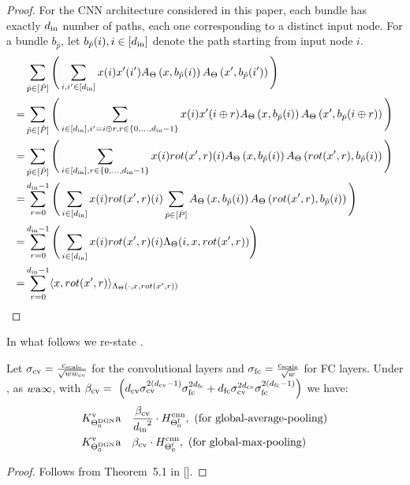 \begin{proof}
For the CNN architecture considered in this paper, each bundle has exactly $d_{\text{in}}$ number of paths, each one corresponding to a distinct input node. For a bundle $b_{\hat{p}}$, let $b_{\hat{p}}(i),i\in[d_{\text{in}}]$ denote the path starting from input node $i$.
\begin{align*}
&\sum_{\hat{p}\in [\hat{P}]} \Bigg(\sum_{i,i'\in[d_{\text{in}}]} x(i) x'(i') A_{\Theta}\left(x,b_{\hat{p}}(i)\right) A_{\Theta}\left(x',b_{\hat{p}}(i')\right) \Bigg)\\
=&\sum_{\hat{p}\in [\hat{P}]}\Bigg(\sum_{i\in[d_{\text{in}}],i'=i\oplus r, r\in\{0,\ldots,d_{\text{in}}-1\}} x(i) x'(i\oplus r) A_{\Theta}\left(x,b_{\hat{p}}(i)\right) A_{\Theta}\left(x',b_{\hat{p}}(i\oplus r)\right)\Bigg)\\
=&\sum_{\hat{p}\in [\hat{P}]}\Bigg(\sum_{i\in[d_{\text{in}}], r\in\{0,\ldots,d_{\text{in}}-1\}} x(i) rot(x',r)(i) A_{\Theta}\left(x,b_{\hat{p}}(i)\right) A_{\Theta}\left(rot(x',r),b_{\hat{p}}(i)\right)\Bigg)\\
=&\sum_{r=0}^{d_{\text{in}}-1} \Bigg(\sum_{i\in[d_{\text{in}}]} x(i) rot(x',r)(i) \sum_{\hat{p}\in [\hat{P}]}  A_{\Theta}\left(x,b_{\hat{p}}(i)\right) A_{\Theta}\left(rot(x',r),b_{\hat{p}}(i)\right)\Bigg)\\
=&\sum_{r=0}^{d_{\text{in}}-1}\Bigg(\sum_{i\in[d_{\text{in}}]} x(i) rot(x',r)(i) \Lambda_{\Theta}(i,x,rot(x',r))\Bigg)\\
=&\sum_{r=0}^{d_{\text{in}}-1} \langle x,rot(x',r)\rangle_{\Lambda_{\Theta}(\cdot,x,rot(x',r))}
\end{align*}
\end{proof}


In what follows we re-state .

\begin{theorem} Let $\sigma_{\text{cv}}=\frac{c_{\text{scale}}}{\sqrt{ww_{\text{cv}}}}$ for the convolutional layers and $\sigma_{\text{fc}}=\frac{c_{\text{scale}}}{\sqrt{w}}$ for FC layers. Under , as $w{\textnormal{a}}\infty$, with  $\beta_{\text{cv}} = \ \left(d_{\text{cv}} \sigma_{\text{cv}}^{2(d_{\text{cv}}-1)}\sigma_{\text{fc}}^{2d_{\text{fc}}}+d_{\text{fc}} \sigma_{\text{cv}}^{2d_{\text{cv}}}\sigma_{\text{fc}}^{2(d_{\text{fc}}-1)}\right)$ we have:
\begin{align*}
&K^{\text{v}}_{\Theta^{\text{DGN}}_0}{\textnormal{a}}\quad \frac{\beta_{\text{cv}}}{{d_{\text{in}}}^2} \cdot H^{\text{cnn}}_{\Theta^{\textrm{f}}_0},\,\,\text{(for global-average-pooling)}\\
&K^{\text{v}}_{\Theta^{\text{DGN}}_0}{\textnormal{a}} \quad{\beta_{\text{cv}}} \cdot H^{\text{cnn}}_{\Theta^{\textrm{f}}_0},\,\,\text{(for global-max-pooling)}\\
\end{align*}
\end{theorem}

\begin{proof}
Follows from Theorem~5.1 in [].
\end{proof}

